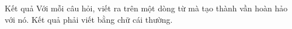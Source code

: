 Kết quả  
Với mỗi câu hỏi, viết ra trên một dòng từ mà tạo thành vần hoàn hảo với nó. Kết quả phải viết bằng chữ cái thường.